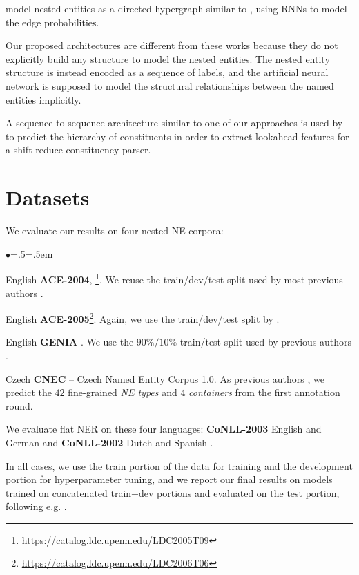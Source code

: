 \documentclass[11pt,a4paper]{article}
\newenvironment{citemize}{\begin{list}{$\bullet$}{\topsep=.5\smallskipamount\itemsep=0pt\parsep=1pt\labelwidth=.5em}}{\end{list}}
\begin{document}
\citet{Katiyar2018} model nested entities as a directed hypergraph similar to
\citet{Lu2015}, using RNNs to model the edge probabilities.

Our proposed architectures are different from these works because they do not
explicitly build any structure to model the nested entities. The nested entity
structure is instead encoded as a sequence of labels, and the artificial neural
network is supposed to model the structural relationships between the named
entities implicitly.

A sequence-to-sequence architecture similar to one of our approaches is used by
\cite{liu-zhang-2017-shift} to predict the hierarchy of constituents in order
to extract lookahead features for a shift-reduce constituency parser.


\section{Datasets}
\label{section:datasets}

We evaluate our results on four nested NE corpora:

\begin{citemize}
  \item English \textbf{ACE-2004},
    \cite{Doddington}\footnote{\url{https://catalog.ldc.upenn.edu/LDC2005T09}}.
    We reuse the train/dev/test split used by most previous authors
    \cite{Lu2015,Muis2017,Wang2018}.
  \item English \textbf{ACE-2005}\footnote{\url{https://catalog.ldc.upenn.edu/LDC2006T06}}.
    Again, we use the train/dev/test split by \citet{Lu2015,Muis2017,Wang2018}.
  \item English \textbf{GENIA} \cite{GENIA}. We use the $90\%/10\%$ train/test split used
    by previous authors \cite{Finkel2009,Lu2015,Muis2017,Wang2018}.
  \item Czech \textbf{CNEC} -- Czech Named Entity Corpus 1.0. As previous authors \cite{Strakova2016}, we predict the $42$ fine-grained \textit{NE types} and $4$ \textit{containers} from the first annotation round.
\end{citemize}

We evaluate flat NER on these four languages: \textbf{CoNLL-2003} English and German \cite{CoNLL2003} and \textbf{CoNLL-2002} Dutch and Spanish \cite{CoNLL2002}.

In all cases, we use the train portion of the data for training and the
development portion for hyperparameter tuning, and we report our final results
on models trained on concatenated train+dev portions and evaluated on the test
portion, following e.g. \cite{Ratinov2009,Lample2016}.
\end{document}
